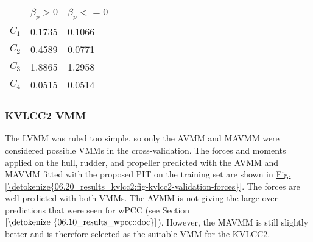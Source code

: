 \documentclass[review]{elsarticle}
\begin{document}
 \begin{savenotes}\sphinxattablestart
 \centering
 \sphinxthecaptionisattop
 \label{\detokenize{06.20_results_kvlcc2:id1}}
 \sphinxaftertopcaption
 \begin{tabulary}{\linewidth}[t]{|T|T|T|}
 \hline
 \sphinxstyletheadfamily &\sphinxstyletheadfamily 
 
 \(\beta_p>0\)
 &\sphinxstyletheadfamily 
 
 \(\beta_p<=0\)
 \\
 \hline
 
 \(C_1\)
 &
 
 \sphinxhyphen{}0.1735
 &
 
 \sphinxhyphen{}0.1066
 \\
 \hline
 
 \(C_2\)
 &
 
 0.4589
 &
 
 0.0771
 \\
 \hline
 
 \(C_3\)
 &
 
 \sphinxhyphen{}1.8865
 &
 
 1.2958
 \\
 \hline
 
 \(C_4\)
 &
 
 0.0515
 &
 
 0.0514
 \\
 \hline
 \end{tabulary}
 \par
 \sphinxattableend\end{savenotes}


\subsubsection{KVLCC2 VMM}
\label{\detokenize{06.20_results_kvlcc2:kvlcc2-vmm}}
  
The LVMM was ruled too simple, so only the AVMM and MAVMM were considered possible VMMs in the cross-validation.
The forces and moments applied on the hull, rudder, and propeller predicted with the AVMM and MAVMM fitted with the proposed PIT on the training set are shown in \hyperref[\detokenize{06.20_results_kvlcc2:fig-kvlcc2-validation-forces}]{Fig.\@ \ref{\detokenize{06.20_results_kvlcc2:fig-kvlcc2-validation-forces}}}.
The forces are well predicted with both VMMs. The AVMM is not giving the large over predictions that were seen for wPCC (see Section \(\ref{\detokenize{06.10_results_wpcc::doc}}\)). However, the MAVMM is still slightly better and is therefore selected as the suitable VMM for the KVLCC2.
\end{document}

